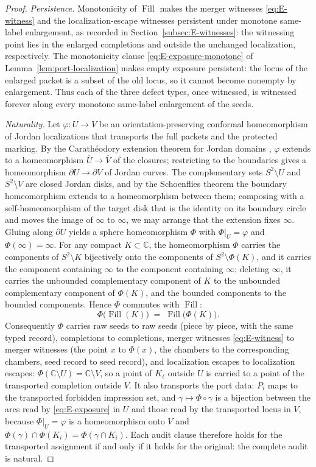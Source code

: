 \documentclass[11pt,reqno]{amsart}
\theoremstyle{definition}
\theoremstyle{remark}
\newcommand{\C}{\mathbb C}
\newcommand{\Fill}{\operatorname{Fill}}
\begin{document}
\begin{proof}
\emph{Persistence.}
Monotonicity of $\Fill$ makes the merger witnesses \eqref{eq:E-witness} and the
localization-escape witnesses persistent under monotone same-label enlargement, as
recorded in Section~\ref{subsec:E-witnesses}: the witnessing point lies in the
enlarged completions and outside the unchanged localization, respectively. The
monotonicity clause \eqref{eq:E-exposure-monotone} of
Lemma~\ref{lem:port-localization} makes empty exposure persistent: the locus of the
enlarged packet is a subset of the old locus, so it cannot become nonempty by
enlargement. Thus each of the three defect types, once witnessed, is witnessed
forever along every monotone same-label enlargement of the seeds.

\emph{Naturality.}
Let $\varphi\colon U\to V$ be an orientation-preserving conformal homeomorphism of
Jordan localizations that transports the full packets and the protected marking. By
the Carath\'eodory extension theorem for Jordan domains \cite{Pom92}, $\varphi$
extends to a homeomorphism $\overline U\to\overline V$ of the closures; restricting
to the boundaries gives a homeomorphism $\partial U\to\partial V$ of Jordan curves.
The complementary sets $S^2\setminus U$ and $S^2\setminus V$ are closed Jordan disks,
and by the Schoenflies theorem \cite{New51} the boundary homeomorphism extends to a
homeomorphism between them; composing with a self-homeomorphism of the target disk
that is the identity on its boundary circle and moves the image of $\infty$ to
$\infty$, we may arrange that the extension fixes $\infty$. Gluing along
$\partial U$ yields a sphere homeomorphism $\Phi$ with $\Phi|_U=\varphi$ and
$\Phi(\infty)=\infty$. For any compact $K\subset\C$, the homeomorphism $\Phi$ carries
the components of $S^2\setminus K$ bijectively onto the components of
$S^2\setminus\Phi(K)$, and it carries the component containing $\infty$ to the
component containing $\infty$; deleting $\infty$, it carries the unbounded
complementary component of $K$ to the unbounded complementary component of
$\Phi(K)$, and the bounded components to the bounded components. Hence $\Phi$
commutes with $\Fill$:
\[
\Phi\bigl(\Fill(K)\bigr)\;=\;\Fill\bigl(\Phi(K)\bigr).
\]
Consequently $\Phi$ carries raw seeds to raw seeds (piece by piece, with the same
typed record), completions to completions, merger witnesses
\eqref{eq:E-witness} to merger witnesses (the point $x$ to $\Phi(x)$, the chambers to
the corresponding chambers, seed record to seed record), and localization escapes to
localization escapes: $\Phi(\C\setminus U)=\C\setminus V$, so a point of $K_\ell$
outside $U$ is carried to a point of the transported completion outside $V$. It also transports the port data: $P_i$ maps to
the transported forbidden impression set, and $\gamma\mapsto\Phi\circ\gamma$ is a
bijection between the arcs read by \eqref{eq:E-exposure} in $U$ and those read by the
transported locus in $V$, because $\Phi|_U=\varphi$ is a homeomorphism onto $V$ and
$\Phi(\gamma)\cap\Phi(K_i)=\Phi(\gamma\cap K_i)$. Each audit clause therefore holds
for the transported assignment if and only if it holds for the original: the
complete audit is natural.
\end{proof}
\end{document}
